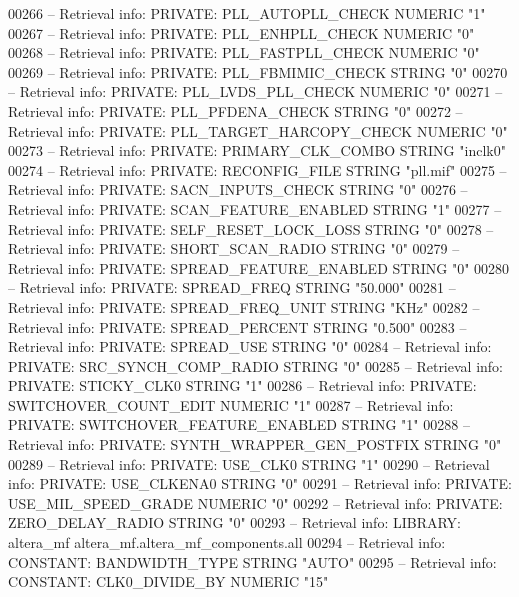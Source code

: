 \begin{DoxyCode}
{00266 \textcolor{keyword}{-- Retrieval info: PRIVATE: PLL\_AUTOPLL\_CHECK NUMERIC "1"}
00267 \textcolor{keyword}{-- Retrieval info: PRIVATE: PLL\_ENHPLL\_CHECK NUMERIC "0"}
00268 \textcolor{keyword}{-- Retrieval info: PRIVATE: PLL\_FASTPLL\_CHECK NUMERIC "0"}
00269 \textcolor{keyword}{-- Retrieval info: PRIVATE: PLL\_FBMIMIC\_CHECK STRING "0"}
00270 \textcolor{keyword}{-- Retrieval info: PRIVATE: PLL\_LVDS\_PLL\_CHECK NUMERIC "0"}
00271 \textcolor{keyword}{-- Retrieval info: PRIVATE: PLL\_PFDENA\_CHECK STRING "0"}
00272 \textcolor{keyword}{-- Retrieval info: PRIVATE: PLL\_TARGET\_HARCOPY\_CHECK NUMERIC "0"}
00273 \textcolor{keyword}{-- Retrieval info: PRIVATE: PRIMARY\_CLK\_COMBO STRING "inclk0"}
00274 \textcolor{keyword}{-- Retrieval info: PRIVATE: RECONFIG\_FILE STRING "pll.mif"}
00275 \textcolor{keyword}{-- Retrieval info: PRIVATE: SACN\_INPUTS\_CHECK STRING "0"}
00276 \textcolor{keyword}{-- Retrieval info: PRIVATE: SCAN\_FEATURE\_ENABLED STRING "1"}
00277 \textcolor{keyword}{-- Retrieval info: PRIVATE: SELF\_RESET\_LOCK\_LOSS STRING "0"}
00278 \textcolor{keyword}{-- Retrieval info: PRIVATE: SHORT\_SCAN\_RADIO STRING "0"}
00279 \textcolor{keyword}{-- Retrieval info: PRIVATE: SPREAD\_FEATURE\_ENABLED STRING "0"}
00280 \textcolor{keyword}{-- Retrieval info: PRIVATE: SPREAD\_FREQ STRING "50.000"}
00281 \textcolor{keyword}{-- Retrieval info: PRIVATE: SPREAD\_FREQ\_UNIT STRING "KHz"}
00282 \textcolor{keyword}{-- Retrieval info: PRIVATE: SPREAD\_PERCENT STRING "0.500"}
00283 \textcolor{keyword}{-- Retrieval info: PRIVATE: SPREAD\_USE STRING "0"}
00284 \textcolor{keyword}{-- Retrieval info: PRIVATE: SRC\_SYNCH\_COMP\_RADIO STRING "0"}
00285 \textcolor{keyword}{-- Retrieval info: PRIVATE: STICKY\_CLK0 STRING "1"}
00286 \textcolor{keyword}{-- Retrieval info: PRIVATE: SWITCHOVER\_COUNT\_EDIT NUMERIC "1"}
00287 \textcolor{keyword}{-- Retrieval info: PRIVATE: SWITCHOVER\_FEATURE\_ENABLED STRING "1"}
00288 \textcolor{keyword}{-- Retrieval info: PRIVATE: SYNTH\_WRAPPER\_GEN\_POSTFIX STRING "0"}
00289 \textcolor{keyword}{-- Retrieval info: PRIVATE: USE\_CLK0 STRING "1"}
00290 \textcolor{keyword}{-- Retrieval info: PRIVATE: USE\_CLKENA0 STRING "0"}
00291 \textcolor{keyword}{-- Retrieval info: PRIVATE: USE\_MIL\_SPEED\_GRADE NUMERIC "0"}
00292 \textcolor{keyword}{-- Retrieval info: PRIVATE: ZERO\_DELAY\_RADIO STRING "0"}
00293 \textcolor{keyword}{-- Retrieval info: LIBRARY: altera\_mf altera\_mf.altera\_mf\_components.all}
00294 \textcolor{keyword}{-- Retrieval info: CONSTANT: BANDWIDTH\_TYPE STRING "AUTO"}
00295 \textcolor{keyword}{-- Retrieval info: CONSTANT: CLK0\_DIVIDE\_BY NUMERIC "15"}
}
\end{DoxyCode}
